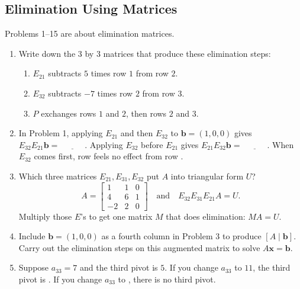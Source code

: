 \documentclass[14pt, a4paper]{article}
\begin{document}
\subsection{Elimination Using Matrices}
\noindent Problems 1--15 are about elimination matrices.

\begin{enumerate}
    \item Write down the $3$ by $3$ matrices that produce these elimination steps:
          \begin{enumerate}
              \item $E_{21}$ subtracts $5$ times row $1$ from row $2$.
              \item $E_{32}$ subtracts $-7$ times row $2$ from row $3$.
              \item $P$ exchanges rows $1$ and $2$, then rows $2$ and $3$.
          \end{enumerate}

    \item In Problem 1, applying $E_{21}$ and then $E_{32}$ to $\boldsymbol{b} = (1,0,0)$ gives $E_{32}E_{21}\boldsymbol{b} = \underline{\hspace{3em}}$. Applying $E_{32}$ before $E_{21}$ gives $E_{21}E_{32}\boldsymbol{b} = \underline{\hspace{3em}}$. When $E_{32}$ comes first, row \underline{\hspace{2em}} feels no effect from row \underline{\hspace{2em}}.

    \item Which three matrices $E_{21}, E_{31}, E_{32}$ put $A$ into triangular form $U$?
          \[
              A = \begin{bmatrix}
                  1  & 1 & 0 \\
                  4  & 6 & 1 \\
                  -2 & 2 & 0
              \end{bmatrix}
              \quad \text{and} \quad
              E_{32}E_{31}E_{21}A = U.
          \]
          Multiply those $E$'s to get one matrix $M$ that does elimination: $MA = U$.

    \item Include $\boldsymbol{b} = (1,0,0)$ as a fourth column in Problem 3 to produce $[A\mid\boldsymbol{b}]$. Carry out the elimination steps on this augmented matrix to solve $A\boldsymbol{x} = \boldsymbol{b}$.

    \item Suppose $a_{33} = 7$ and the third pivot is $5$. If you change $a_{33}$ to $11$, the third pivot is \underline{\hspace{3em}}. If you change $a_{33}$ to \underline{\hspace{3em}}, there is no third pivot.


\end{enumerate}
\end{document}

